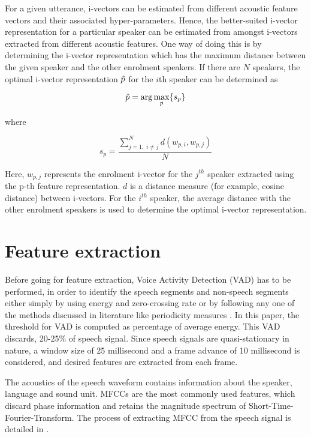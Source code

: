 \documentclass{article}
\begin{document}
For a given utterance, i-vectors can be estimated from different acoustic
feature vectors and their associated hyper-parameters. Hence, the
better-suited i-vector representation for a particular speaker can be estimated
from amongst i-vectors extracted from different acoustic features. One way of
doing this is by determining the i-vector representation which has the maximum
distance between the given speaker and the other enrolment speakers. If there
are $N$ speakers, the optimal i-vector representation $\Hat{p}$ 
for the $i$th speaker can be determined as

\begin{equation}
\Hat{p} = \arg\max_p \{s_p\}
\label{eq:p_hat}
\end{equation}

where 

\begin{equation}
s_p = \frac{\displaystyle \sum_{j=1, \; i \neq j}^N d(w_{p,i},w_{p,j})}{N}
\label{eq:sp}
\end{equation}

Here, $w_{p,j}$ represents the enrolment i-vector for the $j^{th}$ speaker
extracted using the p-th feature representation. $d$ is a distance measure (for
example, cosine distance) between i-vectors. For the $i^{th}$ speaker, the average
distance with the other enrolment speakers is used to determine the optimal
i-vector representation. 

\section{Feature extraction}
\label{sec:featExt}
Before going for feature extraction, Voice Activity Detection (VAD) has to be performed, in order to identify the speech segments and non-speech segments either simply by using energy
 \cite{vadenergy, vadhari} and zero-crossing \cite{vadzc} rate or by following any one of the methods discussed in literature like periodicity measures \cite{vadtucker}.
In this paper, the threshold for VAD is computed as percentage of average energy. This VAD discards, 20-25\% of speech signal. Since speech signals are quasi-stationary in nature, a window size of 25 millisecond and a frame advance of 10 millisecond is considered, and desired features are extracted from each frame. 

The acoustics of the speech waveform contains information about the speaker, language and sound unit. MFCCs are the most commonly used features, which discard phase information and retains the magnitude spectrum of Short-Time-Fourier-Transform. The process of extracting MFCC from the speech signal is detailed in \cite{mel}.
\end{document}
